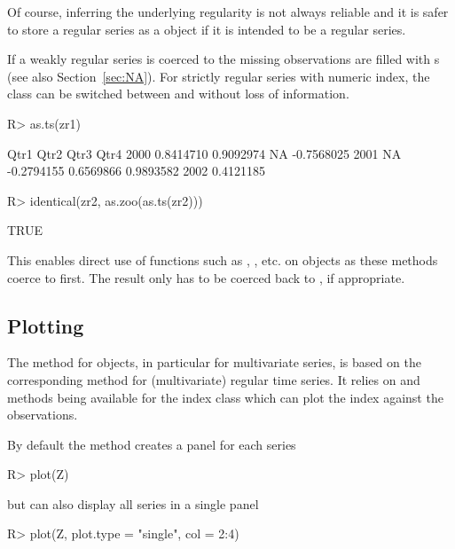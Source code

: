 \documentclass{Z}
\begin{document}
Of course, inferring the underlying regularity is not always reliable and it is safer
to store a regular series as a  object if it is intended to be a regular series.

If a weakly regular series is coerced to  the missing observations are filled
with s (see also Section~\ref{sec:NA}).
For strictly regular series with numeric index, the class can be switched
between  and  without loss of information.

\begin{Schunk}
\begin{Sinput}
R> as.ts(zr1)
\end{Sinput}
\begin{Soutput}
           Qtr1       Qtr2       Qtr3       Qtr4
2000  0.8414710  0.9092974         NA -0.7568025
2001         NA -0.2794155  0.6569866  0.9893582
2002  0.4121185                                 
\end{Soutput}
\begin{Sinput}
R> identical(zr2, as.zoo(as.ts(zr2)))
\end{Sinput}
\begin{Soutput}
[1] TRUE
\end{Soutput}
\end{Schunk}

This enables direct use of functions such as , ,  etc. on 
objects as these methods coerce to  first. 
The result only has to be coerced back to , if appropriate.
 
 
\subsection{Plotting}
\label{sec:plot}

The  method for  objects, in particular for
multivariate  series, is based on the corresponding
method for (multivariate) regular time series. It relies on 
and  methods being available for the index class which can
plot the index against the observations.

By default the  method creates a panel for each series
\begin{Schunk}
\begin{Sinput}
R> plot(Z)
\end{Sinput}
\end{Schunk}
but can also display all series in a single panel
\begin{Schunk}
\begin{Sinput}
R> plot(Z, plot.type = "single", col = 2:4)
\end{Sinput}
\end{Schunk}
\end{document}
